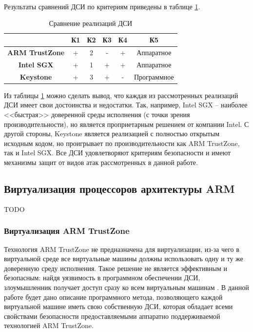 Результаты сравнений ДСИ по критериям приведены в таблице \ref{table:comparsion}.

\begin{table}[!htb]
	\begin{center}
		\caption{Сравнение реализаций ДСИ}
		\label{table:comparsion}
		\begin{tabular}{|c|c|c|c|c|c|}
			\hline
			 & \bfseries К1 & \bfseries К2 & \bfseries К3 & \bfseries К4 & \bfseries К5 \\
			\hline
			\bfseries ARM TrustZone & + & 2 & - & + & Аппаратное \\ \hline
			\bfseries Intel SGX & + & 1 & + & + & Аппаратное\\ \hline
			\bfseries Keystone & + & 3 & + & - & Программное\\ \hline
		\end{tabular}
	\end{center}
\end{table}

Из таблицы \ref{table:comparsion} можно сделать вывод, что каждая из рассмотренных реализаций ДСИ имеет свои достоинства и недостатки. Так, например, Intel SGX -- наиболее <<быстрая>> доверенной среды исполнения (с точки зрения производительности), но является проприетарным решением от компании Intel. С другой стороны, Keystone является реализацией с полностью открытым исходным кодом, но проигрывает по производительности как ARM TrustZone, так и Intel SGX. Все ДСИ удовлетворяют критериям безопасности и имеют механизмы защит от видов атак рассмотренных в данной работе.

\subsection{Виртуализация процессоров архитектуры ARM}

TODO

\subsubsection{Виртуализация ARM TrustZone}

Технология ARM TrustZone не предназначена для виртуализации, из-за чего в виртуальной среде все виртуальные машины должны использовать одну и ту же доверенную среду исполнения. Такое решение не является эффективным и безопасным: найдя уязвимость в программном обеспечении ДСИ, злоумышленник получает доступ сразу ко всем виртуальным машинам \cite{abc}. В данной работе будет дано описание программного метода, позволяющего каждой виртуальной машине иметь свою собственную ДСИ, которая обладает всеми свойствами безопасности предоставляемыми аппаратно поддерживаемой технологией ARM TrustZone.

\pagebreak
